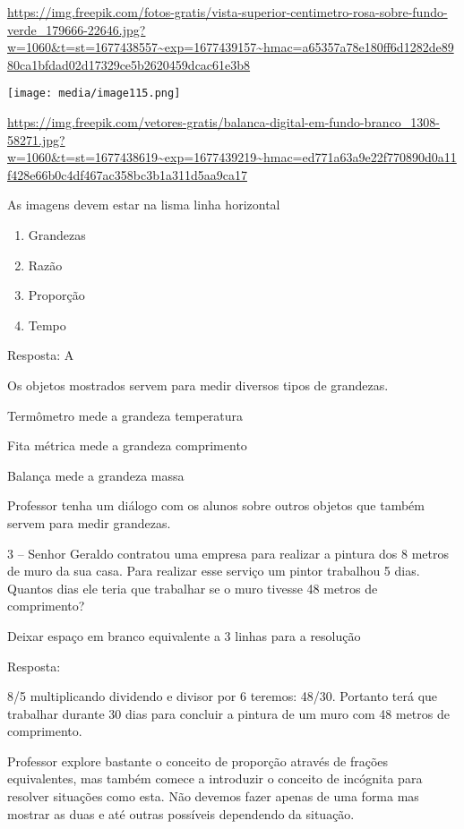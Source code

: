 \url{https://img.freepik.com/fotos-gratis/vista-superior-centimetro-rosa-sobre-fundo-verde_179666-22646.jpg?w=1060\&t=st=1677438557~exp=1677439157~hmac=a65357a78e180ff6d1282de8980ca1bfdad02d17329ce5b2620459dcac61e3b8}

\texttt{[image: media/image115.png]}

\url{https://img.freepik.com/vetores-gratis/balanca-digital-em-fundo-branco_1308-58271.jpg?w=1060\&t=st=1677438619~exp=1677439219~hmac=ed771a63a9e22f770890d0a11f428e66b0c4df467ac358bc3b1a311d5aa9ca17}

As imagens devem estar na lisma linha horizontal

\begin{enumerate}
\def\labelenumi{\alph{enumi})}
\item
  Grandezas
\item
  Razão
\item
  Proporção
\item
  Tempo
\end{enumerate}

Resposta: A

Os objetos mostrados servem para medir diversos tipos de grandezas.

Termômetro mede a grandeza temperatura

Fita métrica mede a grandeza comprimento

Balança mede a grandeza massa

Professor tenha um diálogo com os alunos sobre outros objetos que também
servem para medir grandezas.

3 -- Senhor Geraldo contratou uma empresa para realizar a pintura dos 8
metros de muro da sua casa. Para realizar esse serviço um pintor
trabalhou 5 dias. Quantos dias ele teria que trabalhar se o muro tivesse
48 metros de comprimento?

Deixar espaço em branco equivalente a 3 linhas para a resolução

Resposta:

8/5 multiplicando dividendo e divisor por 6 teremos: 48/30. Portanto
terá que trabalhar durante 30 dias para concluir a pintura de um muro
com 48 metros de comprimento.

Professor explore bastante o conceito de proporção através de frações
equivalentes, mas também comece a introduzir o conceito de incógnita
para resolver situações como esta. Não devemos fazer apenas de uma forma
mas mostrar as duas e até outras possíveis dependendo da situação.

